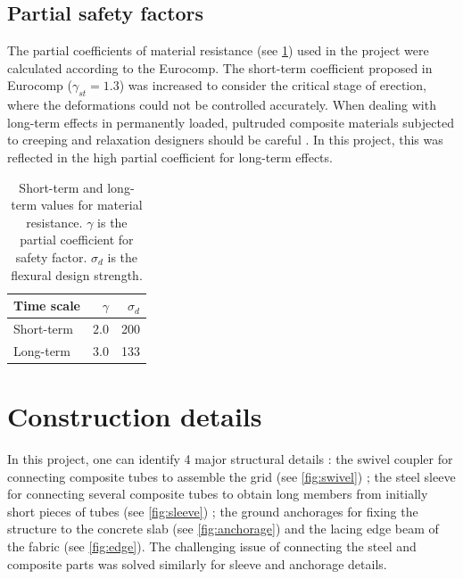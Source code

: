 \subsection{Partial safety factors}\label{sec=safety}
The partial coefficients of material resistance (see \cref{tab:gamma}) used in the project were calculated according to the Eurocomp. The short-term coefficient proposed in Eurocomp ($\gamma_{st} = 1.3$) was increased to consider the critical stage of erection, where the deformations could not be controlled accurately.
When dealing with long-term effects in permanently loaded, pultruded composite materials subjected to creeping and relaxation designers should be careful  \cite{Kotelnikova2012,Bank2006}. In this project, this was reflected in the high partial coefficient for long-term effects.
\bigskip
\begin{table}[h]
\centering
 	\begin{tabular}{@{}l r r @{}}
	\toprule
	Time scale 	& $\gamma$		& $\sigma_{d}$\\
	\midrule
	Short-term 	& $ 2.0$ 			& 200 \\
	Long-term 	& $ 3.0$ 			& 133 \\
	\bottomrule
	\end{tabular}
	\caption[Short-term and long-term values for material resistance]{Short-term and long-term values for material resistance. $\gamma$ is the partial coefficient for safety factor. $\sigma_{d}$ is the flexural design strength.}
	\label{tab:gamma}
\end{table}




\section{Construction details}\label{sec=construction_details}
In this project, one can identify 4 major structural details : the swivel coupler for connecting composite tubes to assemble the grid (see \cref{fig:swivel}) ; the steel sleeve for connecting several composite tubes to obtain long members from initially short pieces of tubes (see \cref{fig:sleeve}) ; the ground anchorages for fixing the structure to the concrete slab (see \cref{fig:anchorage}) and the lacing edge beam of the fabric (see \autoref{fig:edge}). The challenging issue of connecting the steel and composite parts was solved similarly for sleeve and anchorage details.


